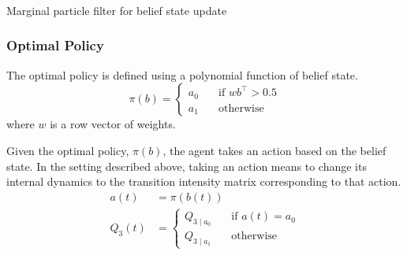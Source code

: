\begin{algorithm}[H]
	
	\vspace{+4pt}
	\begin{algorithmic}[1]
		\\
		
		 \\
		 \label{lst:weight_update}
		\ENDFOR \\
		\\
		\\
		\ENDFOR 
	\end{algorithmic}
	\caption{Marginal particle filter for belief state update \cite{Studer2016}}
	\label{alg:part_filter}
\end{algorithm}

\subsubsection{Optimal Policy}
The optimal policy is defined using a polynomial function of belief state.
\begin{equation}
\pi(b) = 
\begin{cases}
a_0 & \quad \text{if } wb^\intercal > 0.5 \\
a_1 & \quad \text{otherwise}
\end{cases}
\label{eq:policy}
\end{equation}
where $ w $ is a row vector of weights.\par
Given the optimal policy, $ \pi(b) $, the agent takes an action based on the belief state. In the setting described above, taking an action means to change its internal dynamics to the transition intensity matrix corresponding to that action.
\begin{align}
a(t) &= \pi(b(t))\\
Q_3(t) & = \begin{cases}
Q_{3\mid a_{0}} & \quad \text{if } a(t) = a_0 \\
Q_{3\mid a_{1}} & \quad \text{otherwise}
\end{cases}
\label{eq:Q_3_traj}
\end{align}

